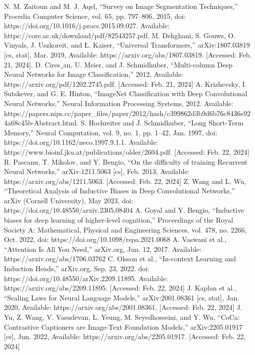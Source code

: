 \documentclass[conference]{IEEEtran}
\begin{document}
\begin{thebibliography}{00}

 N. M. Zaitoun and M. J. Aqel, “Survey on Image Segmentation Techniques,” Procedia Computer Science, vol. 65, pp. 797–806, 2015, doi: https://doi.org/10.1016/j.procs.2015.09.027. Available: https://core.ac.uk/download/pdf/82543257.pdf.
 M. Dehghani, S. Gouws, O. Vinyals, J. Uszkoreit, and Ł. Kaiser, “Universal Transformers,” arXiv:1807.03819 [cs, stat], Mar. 2019, Available: https://arxiv.org/abs/1807.03819. [Accessed: Feb. 21, 2024].
 D. Cires¸an, U. Meier, and J. Schmidhuber, “Multi-column Deep Neural Networks for Image Classification,” 2012, Available: https://arxiv.org/pdf/1202.2745.pdf. [Accessed: Feb. 21, 2024]
 A. Krizhevsky, I. Sutskever, and G. E. Hinton, “ImageNet Classification with Deep Convolutional Neural Networks,” Neural Information Processing Systems, 2012. Available: https://papers.nips.cc/paper\_files/paper/2012/hash/c399862d3b9d6b76c8436e924a68c45b-Abstract.html.
 S. Hochreiter and J. Schmidhuber, “Long Short-Term Memory,” Neural Computation, vol. 9, no. 1, pp. 1–42, Jan. 1997, doi: https://doi.org/10.1162/neco.1997.9.1.1. Available: https://www.bioinf.jku.at/publications/older/2604.pdf. [Accessed: Feb. 22, 2024]
 R. Pascanu, T. Mikolov, and Y. Bengio, “On the difficulty of training Recurrent Neural Networks,” arXiv:1211.5063 [cs], Feb. 2013, Available: https://arxiv.org/abs/1211.5063. [Accessed: Feb. 22, 2024]
 Z. Wang and L. Wu, “Theoretical Analysis of Inductive Biases in Deep Convolutional Networks,” arXiv (Cornell University), May 2023, doi: https://doi.org/10.48550/arxiv.2305.08404
 A. Goyal and Y. Bengio, “Inductive biases for deep learning of higher-level cognition,” Proceedings of the Royal Society A: Mathematical, Physical and Engineering Sciences, vol. 478, no. 2266, Oct. 2022, doi: https://doi.org/10.1098/rspa.2021.0068
 A. Vaswani et al., “Attention Is All You Need,” arXiv.org, Jun. 12, 2017. Available: https://arxiv.org/abs/1706.03762
 C. Olsson et al., “In-context Learning and Induction Heads,” arXiv.org, Sep. 23, 2022. doi: https://doi.org/10.48550/arXiv.2209.11895. Available: https://arxiv.org/abs/2209.11895. [Accessed: Feb. 22, 2024]
 J. Kaplan et al., “Scaling Laws for Neural Language Models,” arXiv:2001.08361 [cs, stat], Jan. 2020, Available: https://arxiv.org/abs/2001.08361. [Accessed: Feb. 22, 2024]
 J. Yu, Z. Wang, V. Vasudevan, L. Yeung, M. Seyedhosseini, and Y. Wu, “CoCa: Contrastive Captioners are Image-Text Foundation Models,” arXiv:2205.01917 [cs], Jun. 2022, Available: https://arxiv.org/abs/2205.01917. [Accessed: Feb. 22, 2024]

\end{thebibliography}
\end{document}
